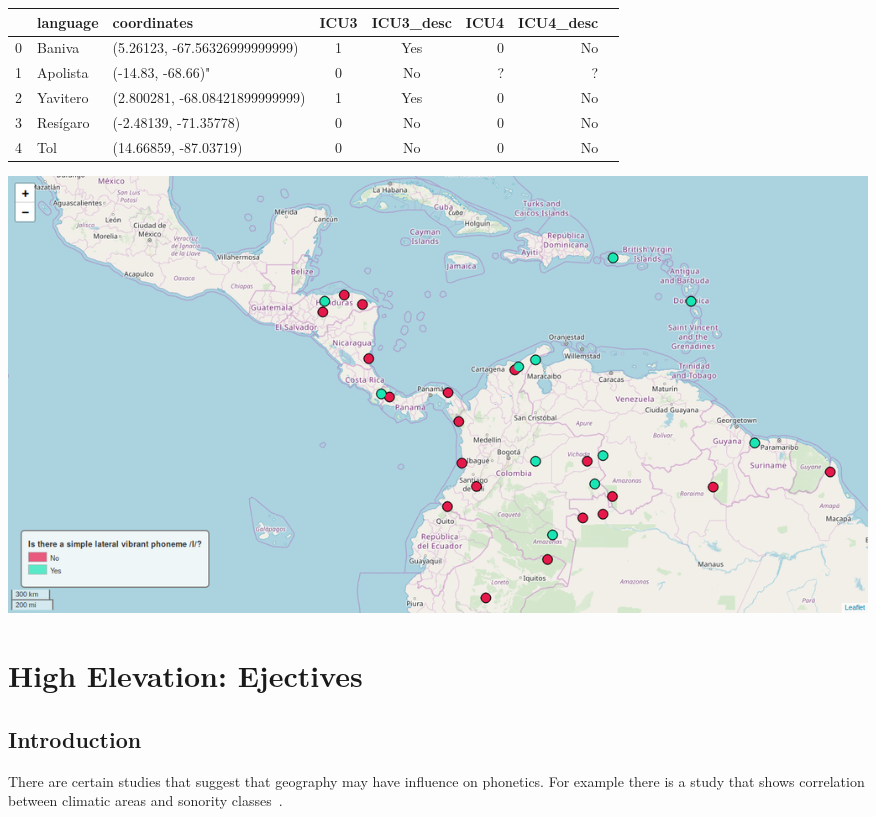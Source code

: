 \documentclass[a4paper,12pt]{article}
\begin{document}
\noindent
\begin{minipage}{\textwidth}
\begin{adjustbox}{max width=\textwidth}
\begin{tabular}{ l | l | l | c | c | r | r | r }
    ~ & language & coordinates & ICU3 & ICU3\_desc & ICU4 & ICU4\_desc \\
    \hline
    0 & Baniva & (5.26123, -67.56326999999999) & 1 & Yes & 0 & No \\
    1 & Apolista & (-14.83, -68.66)" & 0 & No & ? & ? \\
    2 & Yavitero & (2.800281, -68.08421899999999) & 1 & Yes & 0 & No \\
    3 & Resígaro & (-2.48139, -71.35778) & 0 & No & 0 & No \\
    4 & Tol & (14.66859,  -87.03719) & 0 & No & 0 & No \\
\end{tabular}
\end{adjustbox}
\end{minipage}
\bigskip

\noindent
\begin{minipage}{\textwidth}
\includegraphics[width=\textwidth]{images/sails.png}
\end{minipage}

\newpage

\section{High Elevation: Ejectives}

\subsection{Introduction}

There are certain studies that suggest that geography may have influence on phonetics. For example there is a study that shows correlation between climatic areas and sonority classes~\parencite{climatesSonorants}.
\end{document}
